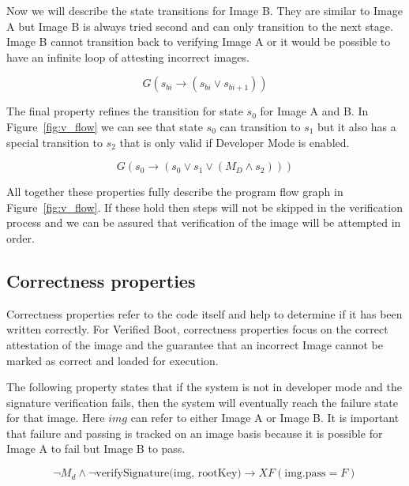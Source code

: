 Now we will describe the state transitions for Image B. 
They are similar to Image A but Image B is always tried second and can only transition to the next stage. 
Image B cannot transition back to verifying Image A or it would be possible to have an infinite loop of attesting incorrect images.

\begin{equation}
    G(s_{bi} \to (s_{bi} \lor s_{bi+1}))
\end{equation}

The final property refines the transition for state $s_0$ for Image A and B.
In Figure~\ref{fig:v_flow} we can see that state $s_0$ can transition to $s_1$ but it also has a special transition to $s_2$ that is only valid if Developer Mode is enabled.

\begin{equation}
    G(s_0 \to (s_0 \lor s_{1} \lor (M_D \land s_{2})))
\end{equation}

All together these properties fully describe the program flow graph in Figure~\ref{fig:v_flow}. 
If these hold then steps will not be skipped in the verification process and we can be assured that verification of the image will be attempted in order.

\subsection{Correctness properties}

Correctness properties refer to the code itself and help to determine if it has been written correctly.
For Verified Boot, correctness properties focus on the correct attestation of the image and the guarantee that an incorrect Image cannot be marked as correct and loaded for execution.

The following property states that if the system is not in developer mode and the signature verification fails, then the system will eventually reach the failure state for that image.
Here $img$ can refer to either Image A or Image B.
It is important that failure and passing is tracked on an image basis because it is possible for Image A to fail but Image B to pass.

\begin{equation} \label{eq:sig_cor}
 \lnot M_d \land \lnot \text{verifySignature(img, rootKey)} \to XF (\text{img.pass} = F)
\end{equation}

